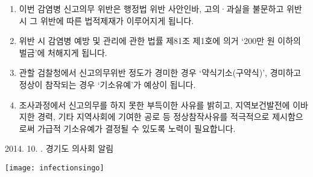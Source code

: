 \begin{enumerate}[첫째,]\tightlist
\item 이번 감염병 신고의무 위반은 행정법 위반 사안인바, 고의·과실을 불문하고 위반 시 그 위반에 따른 법적제재가 이루어지게 됩니다.
\item 위반 시 감염병 예방 및 관리에 관한 법률 제81조 제1호에 의거 ‘200만 원 이하의 벌금’에 처해지게 됩니다.
\item 관할 검찰청에서 신고의무위반 정도가 경미한 경우 ‘약식기소(구약식)’, 경미하고 정상이 참작되는 경우 ‘기소유예’가 예상이 됩니다.
\item 조사과정에서 신고의무를 하지 못한 부득이한 사유를 밝히고, 지역보건발전에 이바지한 경력, 기타 지역사회에 기여한 공로 등 정상참작사유를 적극적으로 제시함으로써 가급적 기소유예가 결정될 수 있도록 노력이 필요합니다.
\end{enumerate}
\begin{flushright}
2014. 10.  . 경기도 의사회 알림
\end{flushright}

\texttt{[image: infectionsingo]}
